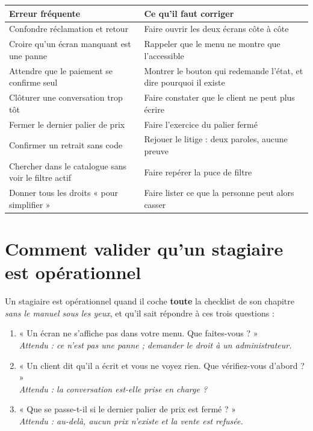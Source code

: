 \documentclass[11pt,a4paper]{report}
\begin{document}
\begin{longtable}{@{}p{6cm} p{8.8cm}@{}}
\toprule
\bfseries Erreur fréquente & \bfseries Ce qu'il faut corriger \\
\midrule
\endhead
Confondre réclamation et retour
  & Faire ouvrir les deux écrans côte à côte \\[4pt]
Croire qu'un écran manquant est une panne
  & Rappeler que le menu ne montre que l'accessible \\[4pt]
Attendre que le paiement se confirme seul
  & Montrer le bouton qui redemande l'état, et dire pourquoi il existe \\[4pt]
Clôturer une conversation trop tôt
  & Faire constater que le client ne peut plus écrire \\[4pt]
Fermer le dernier palier de prix
  & Faire l'exercice du palier fermé \\[4pt]
Confirmer un retrait sans code
  & Rejouer le litige : deux paroles, aucune preuve \\[4pt]
Chercher dans le catalogue sans voir le filtre actif
  & Faire repérer la puce de filtre \\[4pt]
Donner tous les droits « pour simplifier »
  & Faire lister ce que la personne peut alors casser \\
\bottomrule
\end{longtable}

\section{Comment valider qu'un stagiaire est opérationnel}

Un stagiaire est opérationnel quand il coche \textbf{toute} la checklist de son
chapitre \emph{sans le manuel sous les yeux}, et qu'il sait répondre à ces trois
questions :

\begin{enumerate}[leftmargin=*,itemsep=4pt]
  \item « Un écran ne s'affiche pas dans votre menu. Que faites-vous ? »\\
        \textit{Attendu : ce n'est pas une panne ; demander le droit à un
        administrateur.}
  \item « Un client dit qu'il a écrit et vous ne voyez rien. Que vérifiez-vous
        d'abord ? »\\
        \textit{Attendu : la conversation est-elle prise en charge ?}
  \item « Que se passe-t-il si le dernier palier de prix est fermé ? »\\
        \textit{Attendu : au-delà, aucun prix n'existe et la vente est refusée.}
\end{enumerate}
\end{document}
